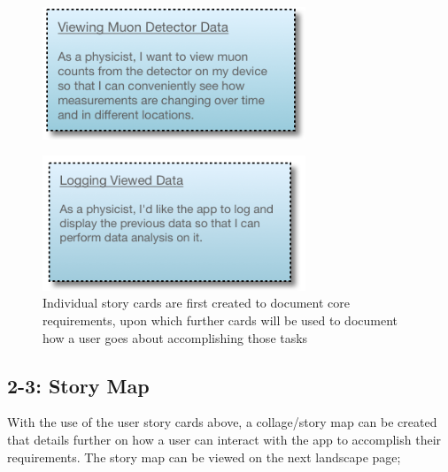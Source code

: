 \documentclass[11pt,a4paper]{article}
\begin{document}
\begin{figure}[h]
  \centering
  
      \includegraphics[width=0.7\textwidth]{storycard2.png}
     
  
\end{figure}

\begin{figure}[h]
  \centering
  
      \includegraphics[width=0.7\textwidth]{storycard3.png}
      \caption{Individual story cards are first created to document core requirements, upon which further cards will be used to document how a user goes about accomplishing those tasks}
  
\end{figure}


\subsection*{2-3: Story Map}

With the use of the user story cards above, a collage/story map can be created that details further on how a user can interact with the app to accomplish their requirements. The story map can be viewed on the next landscape page;
\end{document}
